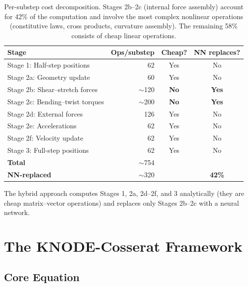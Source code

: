 \documentclass[11pt]{article}
\begin{document}
\begin{table}[H]
  \centering
  \renewcommand{\arraystretch}{1.2}
  \begin{tabular}{lrcc}
    \toprule
    \textbf{Stage} & \textbf{Ops/substep} & \textbf{Cheap?} & \textbf{NN replaces?} \\
    \midrule
    Stage 1: Half-step positions & 62 & Yes & No \\
    Stage 2a: Geometry update & 60 & Yes & No \\
    Stage 2b: Shear--stretch forces & $\sim$120 & \textbf{No} & \textbf{Yes} \\
    Stage 2c: Bending--twist torques & $\sim$200 & \textbf{No} & \textbf{Yes} \\
    Stage 2d: External forces & 126 & Yes & No \\
    Stage 2e: Accelerations & 62 & Yes & No \\
    Stage 2f: Velocity update & 62 & Yes & No \\
    Stage 3: Full-step positions & 62 & Yes & No \\
    \midrule
    \textbf{Total} & $\sim$754 & & \\
    \textbf{NN-replaced} & $\sim$320 & & \textbf{42\%} \\
    \bottomrule
  \end{tabular}
  \caption{Per-substep cost decomposition.  Stages 2b--2c (internal force assembly) account for 42\% of the computation and involve the most complex nonlinear operations (constitutive laws, cross products, curvature assembly).  The remaining 58\% consists of cheap linear operations.}
  \label{tab:cost-decomposition}
\end{table}

\noindent
The hybrid approach computes Stages 1, 2a, 2d--2f, and 3 analytically (they are cheap matrix--vector operations) and replaces only Stages 2b--2c with a neural network.

\section{The KNODE-Cosserat Framework}
\label{sec:knode}

\subsection{Core Equation}
\end{document}
